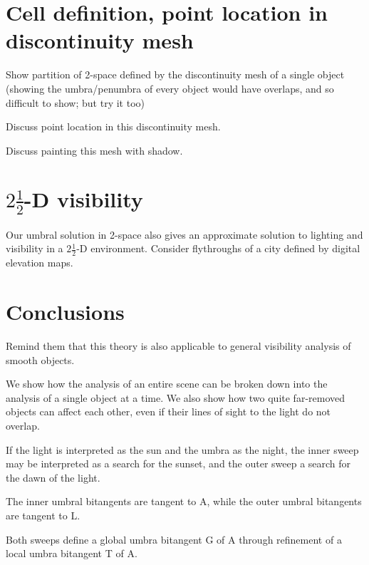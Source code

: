 \documentclass[9pt,twocolumn]{article}
\begin{document}
\section{Cell definition, point location in discontinuity mesh}

Show partition of 2-space defined by the discontinuity mesh of a single object
(showing the umbra/penumbra of every object would have overlaps, and so
difficult to show; but try it too)

Discuss point location in this discontinuity mesh.

Discuss painting this mesh with shadow.


\section{$2 \frac{1}{2}$-D visibility}

Our umbral solution in 2-space also gives an approximate solution
to lighting and visibility in a $2 \frac{1}{2}$-D environment.
Consider flythroughs of a city defined by digital elevation maps.


\section{Conclusions}

Remind them that this theory is also applicable to general visibility
analysis of smooth objects.

We show how the analysis of an entire scene can be broken down into
the analysis of a single object at a time.
We also show how two quite far-removed objects can affect each other,
even if their lines of sight to the light do not overlap.

If the light is interpreted as the sun and the umbra as the night,
the inner sweep may be interpreted as a search for the sunset,
and the outer sweep a search for the dawn of the light.


The inner umbral bitangents are tangent to A,
while the outer umbral bitangents are tangent to L.

Both sweeps define a global umbra bitangent G of A
through refinement of a local umbra bitangent T of A.
\end{document}
